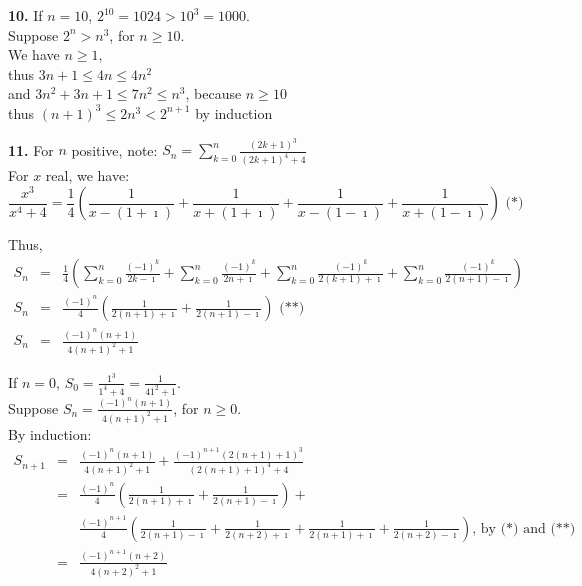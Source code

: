 \documentclass[a4paper,12pt]{article}
\begin{document}
\bigskip
\noindent
\textbf{10.} If $n = 10$, $2^{10} = 1024 > 10^3 = 1000$.\\
Suppose $2^n > n^3$, for $n \ge 10$.\\
We have $n \ge 1$,\\
thus $3n+1 \le 4n \le 4n^2$\\
and $3n^2+3n+1 \le 7n^2 \le n^3$, because $n \ge 10$\\
thus $(n+1)^3 \le 2n^3 < 2^{n+1}$ by induction

\bigskip
\noindent
\textbf{11.} For $n$ positive, note: 
$S_n = \sum_{k=0}^n\frac{(2k+1)^3}{(2k+1)^4 + 4}$\\
For $x$ real, we have:
\[ \frac{x^3}{x^4 + 4} =
\frac{1}{4} \left(\frac{1}{x - (1+\imath)} + \frac{1}{x + (1+\imath)} +
\frac{1}{x-(1-\imath)} + \frac{1}{x + (1-\imath)}\right)\mbox{ (*)}
\]

Thus,
\begin{eqnarray*}
S_n & = & \frac{1}{4}\left(
\sum_{k=0}^n\frac{(-1)^k}{2k-\imath} + \sum_{k=0}^n\frac{(-1)^k}{2n+\imath} +
\sum_{k=0}^n\frac{(-1)^k}{2(k+1)+\imath} + 
\sum_{k=0}^n\frac{(-1)^k}{2(n+1)-\imath} \right)
\\
S_n & = & \frac{(-1)^n}{4} \left(\frac{1}{2(n+1)+\imath} +
\frac{1}{2(n+1)-\imath}\right)\mbox{ (**)}
\\
S_n & = & \frac{(-1)^n(n+1)}{4(n+1)^2 + 1}
\end{eqnarray*}

\noindent
If $n=0$, $S_0 = \frac{1^3}{1^4+4} = \frac{1}{4 1^2 + 1}$.\\
Suppose $S_n = \frac{(-1)^n (n+1)} {4(n+1)^2 + 1}$, for $n \ge 0$.\\
By induction:
\begin{eqnarray*}
S_{n+1} & = & \frac{(-1)^n(n+1)}{4(n+1)^2+1} +
\frac{(-1)^{n+1}(2(n+1)+1)^3}{(2(n+1)+1)^4 + 4}
\\ & = &
\frac{(-1)^n}{4} 
\left(\frac{1}{2(n+1)+\imath} + \frac{1}{2(n+1)-\imath}\right) +
\\&&
\frac{(-1)^{n+1}}{4}
\left(\frac{1}{2(n+1)-\imath} + \frac{1}{2(n+2)+\imath} +
\frac{1}{2(n+1)+\imath} + \frac{1}{2(n+2)-\imath}\right)
\mbox{, by (*) and (**)}
\\ & = &
\frac{(-1)^{n+1} (n+2)}{4(n+2)^2+1} 
\end{eqnarray*}
\end{document}
